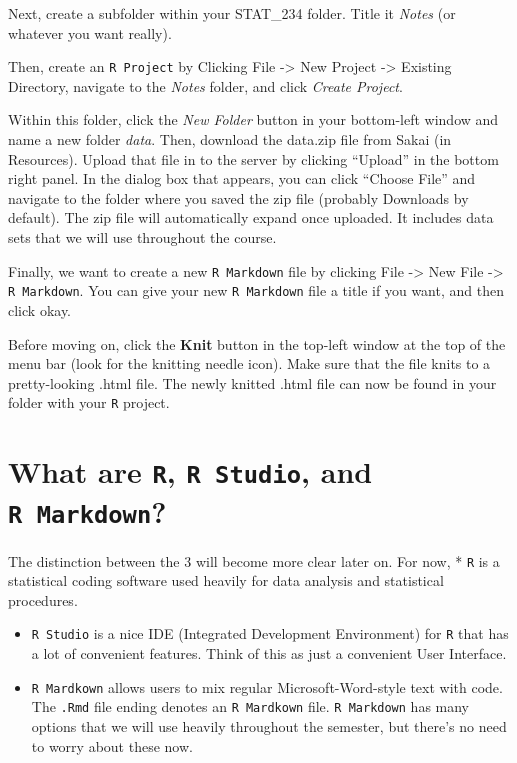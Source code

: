 \documentclass[
]{book}
\begin{document}
Next, create a subfolder within your STAT\_234 folder. Title it \emph{Notes} (or whatever you want really).

Then, create an \texttt{R\ Project} by Clicking File -\textgreater{} New Project -\textgreater{} Existing Directory, navigate to the \emph{Notes} folder, and click \emph{Create Project}.

Within this folder, click the \emph{New Folder} button in your bottom-left window and name a new folder \emph{data}. Then, download the data.zip file from Sakai (in Resources). Upload that file in to the server by clicking ``Upload'' in the bottom right panel. In the dialog box that appears, you can click ``Choose File'' and navigate to the folder where you saved the zip file (probably Downloads by default). The zip file will automatically expand once uploaded. It includes data sets that we will use throughout the course.

Finally, we want to create a new \texttt{R\ Markdown} file by clicking File -\textgreater{} New File -\textgreater{} \texttt{R\ Markdown}. You can give your new \texttt{R\ Markdown} file a title if you want, and then click okay.

Before moving on, click the \textbf{Knit} button in the top-left window at the top of the menu bar (look for the knitting needle icon). Make sure that the file knits to a pretty-looking .html file. The newly knitted .html file can now be found in your folder with your \texttt{R} project.

\hypertarget{what-are-r-r-studio-and-r-markdown}{%
\section{\texorpdfstring{What are \texttt{R}, \texttt{R\ Studio}, and \texttt{R\ Markdown}?}{What are R, R Studio, and R Markdown?}}\label{what-are-r-r-studio-and-r-markdown}}

The distinction between the 3 will become more clear later on. For now,
* \texttt{R} is a statistical coding software used heavily for data analysis and statistical procedures.

\begin{itemize}
\item
  \texttt{R\ Studio} is a nice IDE (Integrated Development Environment) for \texttt{R} that has a lot of convenient features. Think of this as just a convenient User Interface.
\item
  \texttt{R\ Mardkown} allows users to mix regular Microsoft-Word-style text with code. The \texttt{.Rmd} file ending denotes an \texttt{R\ Mardkown} file. \texttt{R\ Markdown} has many options that we will use heavily throughout the semester, but there's no need to worry about these now.
\end{itemize}
\end{document}

